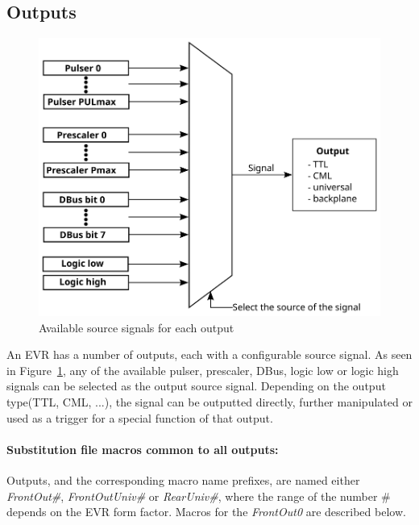 \documentclass[12pt,a4paper]{article}
\begin{document}
\subsection{Outputs}\label{sec:Outputs}
\begin{figure}[H]
	\centering
	\includegraphics[]{./img/output}
	\caption{Available source signals for each output}
	\label{fig:output}
\end{figure}

An EVR has a number of outputs, each with a configurable source signal. As seen in Figure~\ref{fig:output}, any of the available pulser, prescaler, DBus, logic low or logic high signals can be selected as the output source signal. Depending on the output type(TTL, CML, ...), the signal can be outputted directly, further manipulated or used as a trigger for a special function of that output.

\paragraph{Substitution file macros common to all outputs:} Outputs, and the corresponding macro name prefixes, are named either \emph{FrontOut\#},\emph{ FrontOutUniv\#} or \emph{RearUniv\#}, where the range of the number \# depends on the EVR form factor. Macros for the \emph{FrontOut0} are described below. 
\end{document}
